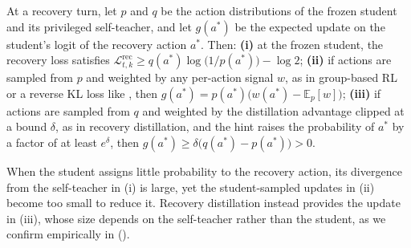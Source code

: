 \documentclass[10pt, logo, onecolumn, copyright]{nv}
\begin{document}
\begin{proposition}
\label{prop:rescue}
At a recovery turn, let $p$ and $q$ be the action distributions of the frozen student and its privileged self-teacher, and let $g(a^{*})$ be the expected update on the student's logit of the recovery action $a^{*}$. Then:
\textbf{(i)} at the frozen student, the recovery loss satisfies $\mathcal{L}^{\mathrm{rec}}_{t,k} \ge q(a^{*}) \log\bigl(1/p(a^{*})\bigr) - \log 2$;
\textbf{(ii)} if actions are sampled from $p$ and weighted by any per-action signal $w$, as in group-based RL or a reverse KL loss like , then $g(a^{*}) = p(a^{*})\bigl(w(a^{*}) - \mathbb{E}_{p}[w]\bigr)$;
\textbf{(iii)} if actions are sampled from $q$ and weighted by the distillation advantage clipped at a bound $\delta$, as in recovery distillation, and the hint raises the probability of $a^{*}$ by a factor of at least $e^{\delta}$, then $g(a^{*}) \ge \delta\bigl(q(a^{*}) - p(a^{*})\bigr) > 0$.
\end{proposition}

When the student assigns little probability to the recovery action, its divergence from the self-teacher in (i) is large, yet the student-sampled updates in (ii) become too small to reduce it. Recovery distillation instead provides the update in (iii), whose size depends on the self-teacher rather than the student, as we confirm empirically in  ().
\end{document}
